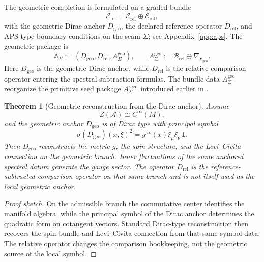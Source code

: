 \documentclass[11pt,a4paper]{article}
\newtheorem{theorem}{Theorem}[section]
\theoremstyle{definition}
\theoremstyle{remark}
\newcommand{\Seam}{\Sigma}
\newcommand{\chigeo}{\chi_{\mathrm{geo}}}
\begin{document}
The geometric completion is formulated on a graded bundle
\[
\mathcal E_{\mathrm{rel}}=\mathcal E_{\mathrm{rel}}^+\oplus\mathcal E_{\mathrm{rel}}^-,
\]
with the geometric Dirac anchor $D_{\mathrm{geo}}$, the declared reference operator
$D_{\mathrm{ref}}$, and APS-type boundary conditions on the seam $\Seam$; see
Appendix~\ref{app:aps}. The geometric package is
\[
\mathbb A_{\Seam}:=(D_{\mathrm{geo}},D_{\mathrm{rel}},A_{\Sigma}^{\mathrm{geo}}),
\qquad
A_{\Sigma}^{\mathrm{geo}}:=\mathcal B_{\mathrm{rel}}\oplus\nabla_{\chigeo}.
\]
Here $D_{\mathrm{geo}}$ is the geometric Dirac anchor, while $D_{\mathrm{rel}}$ is the relative comparison operator entering the spectral subtraction formulas. The bundle data $A_{\Sigma}^{\mathrm{geo}}$ reorganize the primitive seed package $A_{\Sigma}^{\mathrm{seed}}$ introduced earlier in .
\begin{theorem}[Geometric reconstruction from the Dirac anchor]
\label{thm:geometric-reconstruction-anchor}
\label{thm:geometric-reconstruction-from-Dgeo}
\label{thm:relative-geometric-reconstruction}
Assume
\[
Z(\mathcal A)\cong C^\infty(M),
\]
and the geometric anchor $D_{\mathrm{geo}}$ is of Dirac type with principal symbol
\[
\sigma(D_{\mathrm{geo}})(x,\xi)^2
=
g^{\mu\nu}(x)\xi_\mu\xi_\nu\,\mathbf 1.
\]
Then $D_{\mathrm{geo}}$ reconstructs the metric $g$, the spin structure, and the
Levi--Civita connection on the geometric branch. Inner fluctuations of the same anchored
spectral datum generate the gauge sector.
The operator $D_{\mathrm{rel}}$ is the reference-subtracted comparison operator on that
same branch and is not itself used as the local geometric anchor.
\end{theorem}

\begin{proof}[Proof sketch]
On the admissible branch the commutative center identifies the manifold algebra, while the
principal symbol of the Dirac anchor determines the quadratic form on cotangent vectors.
Standard Dirac-type reconstruction then recovers the spin bundle and Levi--Civita connection
from that same symbol data. The relative operator changes the comparison bookkeeping, not the
geometric source of the local symbol.
\end{proof}
\end{document}
